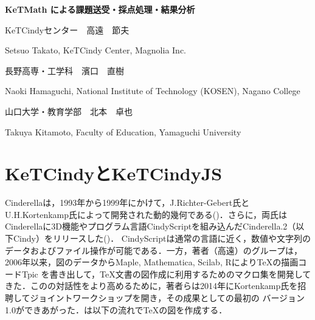 \documentclass[a4j,12pt]{ujarticle}
\begin{document}
\begin{center}

{\bf \Large KeTMath による課題送受・採点処理・結果分析}

\end{center}

\mbox{}

\begin{center}

KeTCindyセンター　高遠　節夫

Setsuo Takato, KeTCindy Center, Magnolia Inc.


長野高専・工学科　濱口　直樹

Naoki Hamaguchi, National Institute of Technology (KOSEN), Nagano College

山口大学・教育学部　北本　卓也

Takuya Kitamoto, Faculty of Education, Yamaguchi University

\end{center}

\section{KeTCindyとKeTCindyJS}

Cinderellaは，1993年から1999年にかけて，J.Richter-Gebert氏とU.H.Kortenkamp氏によって開発された動的幾何である(\cite{Cinderella1})．さらに，両氏はCinderellaに3D機能やプログラム言語CindyScriptを組み込んだCinderella.2（以下Cindy）をリリースした(\cite{Cinderella2})．
CindyScriptは通常の言語に近く，数値や文字列のデータおよびファイル操作が可能である．一方，著者（高遠）のグループは，2006年以来，図のデータからMaple, Mathematica, Scilab, Rにより\TeX の描画コードTpic を書き出して，\TeX 文書の図作成に利用するためのマクロ集\ketpic を開発してきた．この\ketpic の対話性をより高めるために，著者らは2014年にKortenkamp氏を招聘してジョイントワークショップを開き，その成果として\ketcindy の最初の
バージョン1.0ができあがった．\ketcindy は以下の流れで\TeX の図を作成する．\vspace{-2mm}
\end{document}
